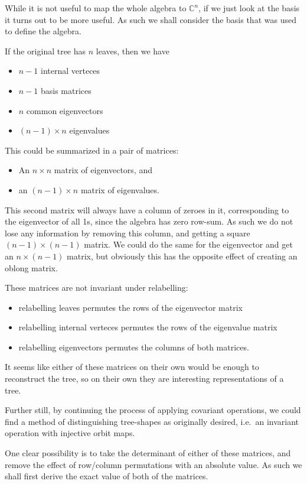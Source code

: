 \documentclass[10pt,a4paper]{report}
\newcommand{\C}{\mathbb{C}}
\begin{document}
While it is not useful to map the whole algebra to $\C^n$, if we just look at
the basis it turns out to be more useful.
As such we shall consider the basis that was used to define the algebra.

If the original tree has $n$ leaves, then we have
\begin{itemize}
	\item $n-1$ internal verteces
	\item $n-1$ basis matrices
	\item $n$ common eigenvectors
	\item $(n-1) \times n$ eigenvalues
\end{itemize}

This could be summarized in a pair of matrices:
\begin{itemize}
	\item An $n \times n$ matrix of eigenvectors, and
	\item an $(n-1) \times n$ matrix of eigenvalues.
\end{itemize}

This second matrix will always have a column of zeroes in it, corresponding to
the eigenvector of all 1s, since the algebra has zero row-sum.
As such we do not lose any information by removing this column, and getting a
square $(n-1) \times (n-1)$ matrix.
We could do the same for the eigenvector and get an $n \times (n-1)$ matrix,
but obviously this has the opposite effect of creating an oblong matrix.

These matrices are not invariant under relabelling:
\begin{itemize}
	\item relabelling leaves permutes the rows of the eigenvector matrix
	\item relabelling internal verteces permutes the rows of the eigenvalue
		matrix
	\item relabelling eigenvectors permutes the columns of both matrices.
\end{itemize}

It seems like either of these matrices on their own would be enough to
reconstruct the tree, so on their own they are interesting representations of a
tree.

Further still, by continuing the process of applying covariant operations, we
could find a method of distinguishing tree-shapes as originally desired,
i.e.\ an invariant operation with injective orbit maps.

One clear possibility is to take the determinant of either of these matrices,
and remove the effect of row/column permutations with an absolute value.
As such we shall first derive the exact value of both of the matrices.
\end{document}
